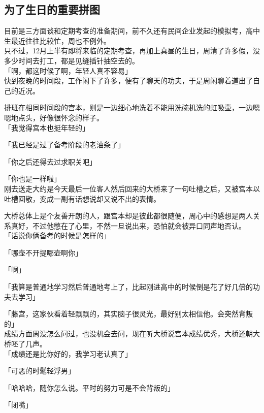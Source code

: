 \subsection{为了生日的重要拼图}

目前是三方面谈和定期考查的准备期间，前不久还有民间企业发起的模拟考，高中生最近往往比较忙，周也不例外。\\

只不过，12月上半有即将来临的定期考查，再加上真昼的生日，周清了许多假，没多少时间去打工，都是见缝插针抽空去的。\\

「啊，都这时候了啊，年轻人真不容易」\\

快到夜晚的时间段，工作闲下了许多，便有了聊天的功夫，于是周闲聊着道出了自己的近况。

排班在相同时间段的宫本，则是一边细心地洗着不能用洗碗机洗的虹吸壶，一边嗯嗯地点头，好像很怀念的样子。\\

「我觉得宫本也挺年轻的」

「我已经是过了备考阶段的老油条了」

「你之后还得去过求职关吧」

「你也是一样啦」\\

刚去送走大约是今天最后一位客人然后回来的大桥来了一句吐槽之后，又被宫本以吐槽回敬，变成一副有话想说却又说不出的表情。

大桥总体上是个友善开朗的人，跟宫本却是彼此都很随便，周心中的感想是两人关系真好，不过他憋在了心里，不然一旦说出来，恐怕就会被异口同声地否认。\\

「话说你俩备考的时候是怎样的」

「哪壶不开提哪壶啊你」

「啊」

「我算是普通地学习然后普通地考上了，比起刚进高中的时候倒是花了好几倍的功夫去学习」

「藤宫，这家伙看着轻飘飘的，其实脑子很灵光，最好别太相信他。会突然背叛的」\\

成绩方面周没怎么问过，也没机会去问，现在听大桥说宫本成绩优秀，大桥还朝大桥呸了几声。\\

「成绩还是比你好的，我学习老认真了」

「可恶的时髦轻浮男」

「哈哈哈，随你怎么说。平时的努力可是不会背叛的」

「闭嘴」\\

